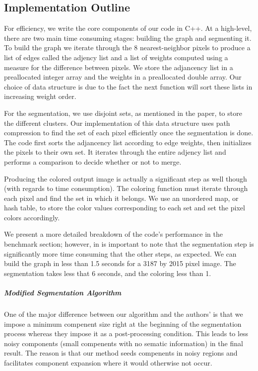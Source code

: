 \documentclass[12pt, english, titlepage]{article}
\begin{document}
\subsection{Implementation Outline}

For efficiency, we write the core components of our code in C++. At a high-level, there are two main time consuming stages: building the graph and segmenting it. To build the graph we iterate through the 8 nearest-neighbor pixels to produce a list of edges called the adjency list and a list of weights computed using a measure for the difference between pixels. We store the adjancency list in a preallocated integer array and the weights in a preallocated double array. Our choice of data structure is due to the fact the next function will sort these lists in increasing weight order.

For the segmentation, we use disjoint sets, as mentioned in the paper, to store the different clusters. Our implementation of this data structure uses path compression to find the set of each pixel efficiently once the segmentation is done. The code first sorts the adjancency list according to edge weights, then initializes the pixels to their own set. It iterates through the entire adjency list and performs a comparison to decide whether or not to merge.
	
Producing the colored output image is actually a significant step as well though (with regards to time consumption). The coloring function must iterate through each pixel and find the set in which it belongs. We use an unordered map, or hash table, to store the color values corresponding to each set and set the pixel colors accordingly.

We present a more detailed breakdown of the code's performance in the benchmark section; however, in is important to note that the segmentation step is significantly more time consuming that the other steps, as expected. We can build the graph in less than 1.5 seconds for a 3187 by 2015 pixel image. The segmentation takes less that 6 seconds, and the coloring less than 1.
	
\subparagraph{Modified Segmentation Algorithm}

One of the major difference between our algorithm and the authors' is that we impose a minimum compenent size right at the beginning of the segmentation process whereas they impose it as a post-processing condition. This leads to less noisy components (small compenents with no sematic information) in the final result. The reason is that our method seeds compenents in noisy regions and facilitates component expansion where it would otherwise not occur.
\end{document}
